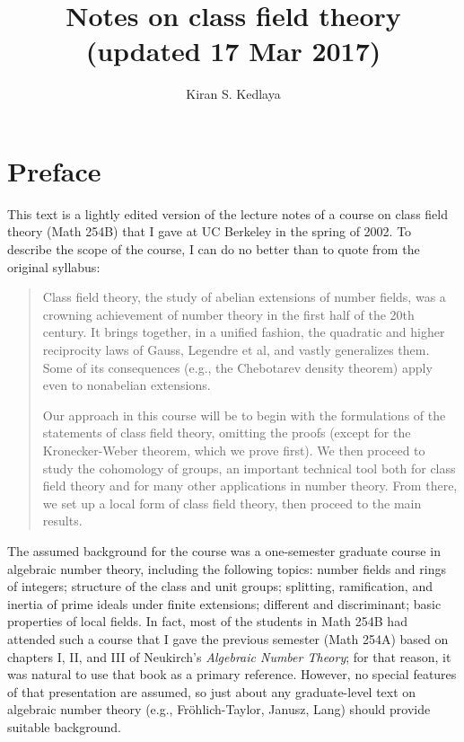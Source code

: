\documentclass{amsbook}
\begin{document}
\title{Notes on class field theory (updated 17 Mar 2017)}
\author{Kiran S. Kedlaya}
\address{Department of Mathematics, University of California, San Diego}

\maketitle
\frontmatter

\tableofcontents

\chapter*{Preface}

This text is a lightly edited version of the lecture notes of a course on class field theory (Math 254B)
that I gave at
UC Berkeley in the spring of 2002. To describe the scope of the course, I can do no better than to quote from the original syllabus:

\begin{quote}
Class field theory, the study of abelian extensions of number fields, was a crowning achievement of number theory in the first half of the 20th century. It brings together, in a unified fashion, the quadratic and higher reciprocity laws of Gauss, Legendre et al, and vastly generalizes them. Some of its consequences (e.g., the Chebotarev density theorem) apply even to nonabelian extensions.

Our approach in this course will be to begin with the formulations of the statements of class field theory, omitting the proofs (except for the Kronecker-Weber theorem, which we prove first). We then proceed to study the cohomology of groups, an important technical tool both for class field theory and for many other applications in number theory. From there, we set up a local form of class field theory, then proceed to the main results. 
\end{quote}

The assumed background for the course was a one-semester graduate course in algebraic number theory,
including the following topics: 
number fields and rings of integers; structure of the class and unit groups; splitting, ramification,
and inertia of prime ideals under finite extensions; different and discriminant; basic properties of local fields.
In fact, most of the students in Math 254B had attended such a course that I gave the previous
semester (Math 254A) based on chapters I, II, and III of Neukirch's \textit{Algebraic Number Theory}; for that reason, it was natural to use that book as a primary reference. 
However, no special features of that presentation are assumed, so just about any graduate-level text on algebraic
number theory (e.g., Fr\"ohlich-Taylor, Janusz, Lang) should provide suitable background.
\end{document}
